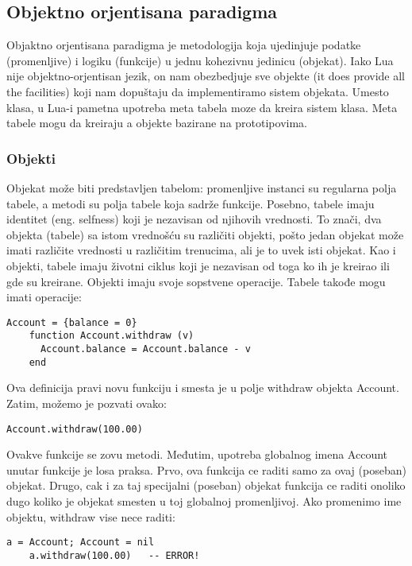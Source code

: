 \documentclass[a4paper]{article}
\begin{document}
\subsection*{Objektno orjentisana paradigma}

Objaktno orjentisana paradigma je metodologija koja ujedinjuje podatke (promenljive) i logiku (funkcije) u jednu kohezivnu jedinicu (objekat). Iako Lua nije objektno-orjentisan jezik, on nam obezbedjuje sve objekte (it does provide all the facilities) koji nam dopuštaju da implementiramo sistem objekata. Umesto klasa, u Lua-i pametna upotreba meta tabela moze da kreira sistem klasa. Meta tabele mogu da kreiraju a objekte bazirane na prototipovima.

\subsubsection*{Objekti}
Objekat može biti predstavljen tabelom: promenljive instanci su regularna polja tabele, a metodi su polja tabele koja sadrže funkcije. Posebno, tabele imaju identitet (eng. selfness) koji je nezavisan od njihovih vrednosti. To znači, dva objekta (tabele) sa istom vrednošću su različiti objekti, pošto jedan objekat može imati različite vrednosti u različitim trenucima, ali je to uvek isti objekat. Kao i objekti, tabele imaju životni ciklus koji je nezavisan od toga ko ih je kreirao ili gde su kreirane.
Objekti imaju svoje sopstvene operacije. Tabele takođe mogu imati operacije:
\begin{lstlisting}[caption={OOP},frame=single, label=oop1]
    Account = {balance = 0}
    function Account.withdraw (v)
      Account.balance = Account.balance - v
    end
\end{lstlisting}
Ova definicija pravi novu funkciju i smesta je u polje withdraw objekta Account. Zatim, možemo je pozvati ovako:
\begin{lstlisting}[caption={OOP},frame=single, label=oop2]
    Account.withdraw(100.00)
\end{lstlisting}

Ovakve funkcije se zovu metodi. Međutim, upotreba globalnog imena Account unutar funkcije je losa praksa. Prvo, ova funkcija ce raditi samo za ovaj (poseban) objekat. Drugo, cak i za taj specijalni (poseban) objekat funkcija ce raditi onoliko dugo koliko je objekat smesten u toj globalnoj promenljivoj. Ako promenimo ime objektu, withdraw vise nece raditi:
\begin{lstlisting}[caption={OOP},frame=single, label=oop3]
    a = Account; Account = nil
    a.withdraw(100.00)   -- ERROR!
\end{lstlisting}
\end{document}
